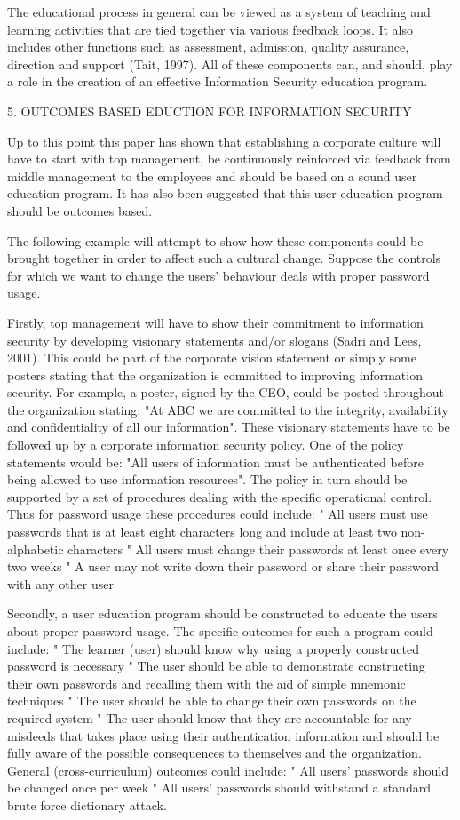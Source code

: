 The educational process in general can be viewed as a system of
teaching and learning activities that are tied together via
various feedback loops. It also includes other functions such as
assessment, admission, quality assurance, direction and support
(Tait, 1997). All of these components can, and should, play a role
in the creation of an effective Information Security education
program.

5.  OUTCOMES BASED EDUCTION FOR INFORMATION SECURITY

Up to this point this paper has shown that establishing a
corporate culture will have to start with top management, be
continuously reinforced via feedback from middle management to the
employees and should be based on a sound user education program.
It has also been suggested that this user education program should
be outcomes based.

The following example will attempt to show how these components
could be brought together in order to affect such a cultural
change. Suppose the controls for which we want to change the
users' behaviour deals with proper password usage.

Firstly, top management will have to show their commitment to
information security by developing visionary statements and/or
slogans (Sadri and Lees, 2001). This could be part of the
corporate vision statement or simply some posters stating that the
organization is committed to improving information security. For
example, a poster, signed by the CEO, could be posted throughout
the organization stating: "At ABC we are committed to the
integrity, availability and confidentiality of all our
information". These visionary statements have to be followed up by
a corporate information security policy. One of the policy
statements would be: "All users of information must be
authenticated before being allowed to use information resources".
The policy in turn should be supported by a set of procedures
dealing with the specific operational control. Thus for password
usage these procedures could include: "   All users must use
passwords that is at least eight characters long and include at
least two non-alphabetic characters "   All users must change
their passwords at least once every two weeks "   A user may not
write down their password or share their password with any other
user

Secondly, a user education program should be constructed to
educate the users about proper password usage. The specific
outcomes for such a program could include: "   The learner (user)
should know why using a properly constructed password is necessary
"   The user should be able to demonstrate constructing their own
passwords and recalling them with the aid of simple mnemonic
techniques "   The user should be able to change their own
passwords on the required system "   The user should know that
they are accountable for any misdeeds that takes place using their
authentication information and should be fully aware of the
possible consequences to themselves and the organization. General
(cross-curriculum) outcomes could include: "   All users'
passwords should be changed once per week "   All users' passwords
should withstand a standard brute force dictionary attack.

